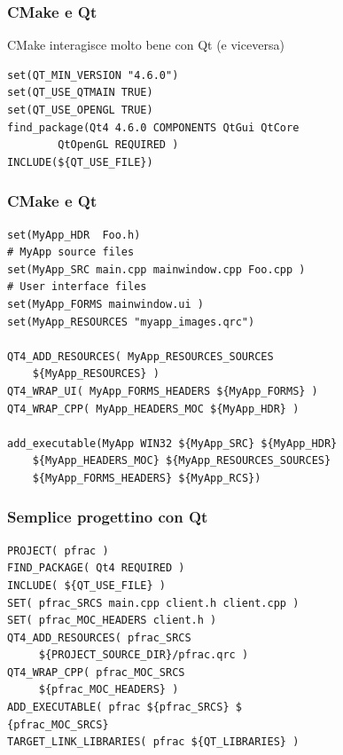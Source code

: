 \documentclass[10pt] {beamer}
\begin{document}
\begin{frame}[fragile]
\frametitle{CMake e Qt}
CMake interagisce molto bene con Qt (e viceversa)
\begin{footnotesize}
\begin{verbatim}
set(QT_MIN_VERSION "4.6.0")
set(QT_USE_QTMAIN TRUE)
set(QT_USE_OPENGL TRUE)
find_package(Qt4 4.6.0 COMPONENTS QtGui QtCore 
	    QtOpenGL REQUIRED )
INCLUDE(${QT_USE_FILE})
\end{verbatim}
\end{footnotesize}
\end{frame}


\begin{frame}[fragile]
 \frametitle{CMake e Qt}
\begin{footnotesize}
\begin{verbatim}
set(MyApp_HDR  Foo.h)
# MyApp source files
set(MyApp_SRC main.cpp mainwindow.cpp Foo.cpp )
# User interface files
set(MyApp_FORMS mainwindow.ui ) 
set(MyApp_RESOURCES "myapp_images.qrc")

QT4_ADD_RESOURCES( MyApp_RESOURCES_SOURCES 
    ${MyApp_RESOURCES} )
QT4_WRAP_UI( MyApp_FORMS_HEADERS ${MyApp_FORMS} )
QT4_WRAP_CPP( MyApp_HEADERS_MOC ${MyApp_HDR} )

add_executable(MyApp WIN32 ${MyApp_SRC} ${MyApp_HDR}
    ${MyApp_HEADERS_MOC} ${MyApp_RESOURCES_SOURCES}
    ${MyApp_FORMS_HEADERS} ${MyApp_RCS})
\end{verbatim}
\end{footnotesize}
\end{frame}

\begin{frame}[fragile]
 \frametitle{Semplice progettino con Qt}
\begin{verbatim}
PROJECT( pfrac )
FIND_PACKAGE( Qt4 REQUIRED )
INCLUDE( ${QT_USE_FILE} )
SET( pfrac_SRCS main.cpp client.h client.cpp )
SET( pfrac_MOC_HEADERS client.h )
QT4_ADD_RESOURCES( pfrac_SRCS 
     ${PROJECT_SOURCE_DIR}/pfrac.qrc )
QT4_WRAP_CPP( pfrac_MOC_SRCS 
     ${pfrac_MOC_HEADERS} )
ADD_EXECUTABLE( pfrac ${pfrac_SRCS} $
{pfrac_MOC_SRCS} 
TARGET_LINK_LIBRARIES( pfrac ${QT_LIBRARIES} )
\end{verbatim}

\end{frame}


\end{document}
